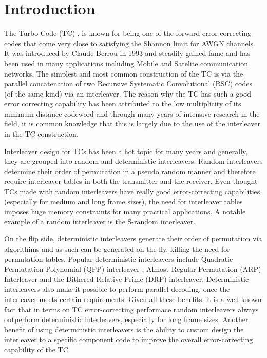 \section{Introduction}
The Turbo Code (TC) \cite{ref1}, is known for being one of the forward-error correcting codes that come very close to satisfying the Shannon limit for AWGN channels. It was introduced by Claude Berrou in 1993 and steadily gained fame and has been used in many applications 
including Mobile and Satelite communication networks. The simplest and most common construction of the TC is via the parallel concatenation of two Recursive Systematic Convolutional (RSC) codes (of the same kind) via an interleaver. The reason why the TC has such a good error correcting capability has been attributed to the low multiplicity of its minimum distance codeword and through many years of intensive research in the field, it is common knowledge that this is largely due to the use of the interleaver in the TC construction.

Interleaver design for TCs has been a hot topic for many years and generally, they are grouped into random and deterministic interleavers. Random interleavers determine their order of permutation in a pseudo random manner and therefore require interleaver tables in both the transmitter and the receiver. Even thought TCs made with random interleavers have really good error-correcting capabilities (especially for medium and long frame sizes), the need for interleaver tables imposes huge memory constraints for many practical applications. A notable example of a random interleaver is the S-random interleaver.

On the flip side, deterministic interleavers generate their order of permutation via algorithims and as such can be generated on the fly, killing the need for permutation tables. Popular deterministic interleavers include Quadratic Permutation Polynomial (QPP) interleaver \cite{ref5}, Almost Regular Permutation (ARP) Interleaver and the Dithered Relative Prime (DRP) interleaver. Deterministic interleavers also make it possible to perform parallel decoding, once the interleaver meets certain requirements. Given all these benefits, it is a well known fact that in terms on TC error-correcting performace random interleavers always outperform deterministic interleavers, especially for long frame sizes.
Another benefit of using deterministic interleavers is the ability to custom design the interleaver to a specific component code to improve the overall error-correcting capability of the TC. 

